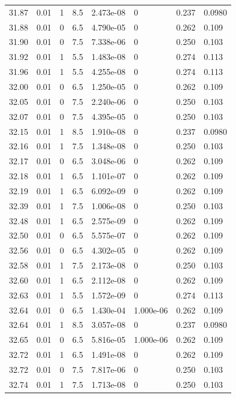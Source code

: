 \documentclass[preview]{standalone}
\begin{document}
{{{{{{{{{{\begin{tabular}{L{1.2cm}C{1.2cm} C{0.3cm}C{0.5cm} C{1.4cm}C{1.4cm} C{1.4cm}C{1.4cm}}
  31.87  &  0.01  & 1     & 8.5 &  2.473e-08  & 0  & 0.237 &  0.0980   \\ 
  31.88  &  0.01  & 0     & 6.5 &  4.790e-05  & 0  & 0.262 &  0.109   \\ 
  31.90  &  0.01  & 0     & 7.5 &  7.338e-06  & 0  & 0.250 &  0.103   \\ 
  31.92  &  0.01  & 1     & 5.5 &  1.483e-08  & 0  & 0.274 &  0.113   \\ 
  31.96  &  0.01  & 1     & 5.5 &  4.255e-08  & 0  & 0.274 &  0.113   \\ 
  32.00  &  0.01  & 0     & 6.5 &  1.250e-05  & 0  & 0.262 &  0.109   \\ 
  32.05  &  0.01  & 0     & 7.5 &  2.240e-06  & 0  & 0.250 &  0.103   \\ 
  32.07  &  0.01  & 0     & 7.5 &  4.395e-05  & 0  & 0.250 &  0.103   \\ 
  32.15  &  0.01  & 1     & 8.5 &  1.910e-08  & 0  & 0.237 &  0.0980   \\ 
  32.16  &  0.01  & 1     & 7.5 &  1.348e-08  & 0  & 0.250 &  0.103   \\ 
  32.17  &  0.01  & 0     & 6.5 &  3.048e-06  & 0  & 0.262 &  0.109   \\ 
  32.18  &  0.01  & 1     & 6.5 &  1.101e-07  & 0  & 0.262 &  0.109   \\ 
  32.19  &  0.01  & 1     & 6.5 &  6.092e-09  & 0  & 0.262 &  0.109   \\ 
  32.39  &  0.01  & 1     & 7.5 &  1.006e-08  & 0  & 0.250 &  0.103   \\ 
  32.48  &  0.01  & 1     & 6.5 &  2.575e-09  & 0  & 0.262 &  0.109   \\ 
  32.50  &  0.01  & 0     & 6.5 &  5.575e-07  & 0  & 0.262 &  0.109   \\ 
  32.56  &  0.01  & 0     & 6.5 &  4.302e-05  & 0  & 0.262 &  0.109   \\ 
  32.58  &  0.01  & 1     & 7.5 &  2.173e-08  & 0  & 0.250 &  0.103   \\ 
  32.60  &  0.01  & 1     & 6.5 &  2.112e-08  & 0  & 0.262 &  0.109   \\ 
  32.63  &  0.01  & 1     & 5.5 &  1.572e-09  & 0  & 0.274 &  0.113   \\ 
  32.64  &  0.01  & 0     & 6.5 &  1.430e-04  & 1.000e-06  & 0.262 &  0.109   \\ 
  32.64  &  0.01  & 1     & 8.5 &  3.057e-08  & 0  & 0.237 &  0.0980   \\ 
  32.65  &  0.01  & 0     & 6.5 &  5.816e-05  & 1.000e-06  & 0.262 &  0.109   \\ 
  32.72  &  0.01  & 1     & 6.5 &  1.491e-08  & 0  & 0.262 &  0.109   \\ 
  32.72  &  0.01  & 0     & 7.5 &  7.817e-06  & 0  & 0.250 &  0.103   \\ 
  32.74  &  0.01  & 1     & 7.5 &  1.713e-08  & 0  & 0.250 &  0.103   \\ 
\hline 
\end{tabular} 

}}}}}}}}}}
\end{document}
